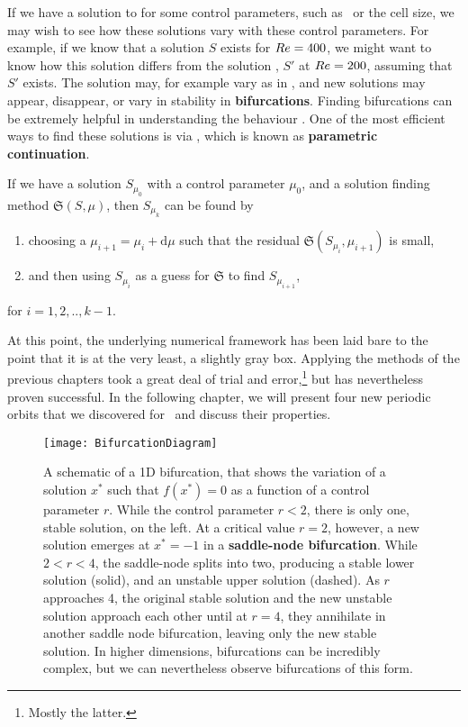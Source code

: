  If we have a solution to  for some control parameters, such as \ReN\ or the cell size, we may wish to see how these solutions vary with these control parameters. For example, if we know that a solution $S$  exists for $Re = 400$, we might want to know how this solution differs from the solution , $S'$ at $Re = 200$, assuming that $S'$ exists. The solution may, for example vary as in , and new solutions may appear, disappear, or vary in stability in {\bf bifurcations}. Finding bifurcations can be extremely helpful in understanding the behaviour .  One of the most efficient ways to find these solutions is via , which is known as {\bf parametric continuation}.
 \begin{algorithm}\label{alg:parCont}
 If we have a solution $S_{\mu_0}$ with a control parameter $\mu_0$,  and a solution finding method $\mathfrak{S}(S,\mu)$, then $S_{\mu_k}$ can be found by
 \begin{enumerate}
 \item choosing a $\mu_{i+1} = \mu_{i} + \mathrm{d}\mu$ such that the residual $\mathfrak{S}(S_{\mu_{i}},\mu_{i+1})$ is small,
 \item and then using $S_{\mu_i}$ as a guess for $\mathfrak{S}$ to find $S_{\mu_{i+1}}$,
 \end{enumerate}
 for $i = 1,2,..,k-1$.
 \end{algorithm}
\par
At this point, the underlying numerical framework has been laid bare to the point that it is at the very least, a slightly gray box. Applying the methods of the previous chapters took a great deal of trial and error,\footnote{Mostly the latter.} but has nevertheless proven successful. In the following chapter, we  will present four new periodic orbits that we discovered for \pCf\, and discuss their properties.   
 \begin{figure}[h]
 \centerline{\texttt{[image: BifurcationDiagram]}}
 \caption{A schematic of a 1D bifurcation, that shows the variation of a solution $x^*$ such that $f(x^*) = 0$ as a function of a control parameter $r$. While the control parameter $r < 2$, there is only one, stable solution, on the left. At a critical value $r = 2$, however, a new solution emerges at $x^* = -1$ in a {\bf saddle-node bifurcation}. While $2 < r < 4$, the saddle-node splits into two, producing a stable lower solution (solid), and an unstable upper solution (dashed). As $r$ approaches 4, the original stable solution and the new unstable solution approach each other until at $r= 4$, they annihilate in another saddle node bifurcation, leaving only the new stable solution. In higher dimensions, bifurcations can be incredibly complex, but we can nevertheless observe bifurcations of this form. }\label{fig:bifurcations}
 \end{figure}
 
 